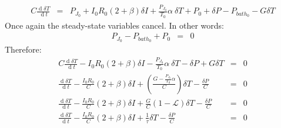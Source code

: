 \documentclass[letterpaper,10pt]{article}
\begin{document}
\begin{eqnarray}
	C \frac{\operatorname{d} \delta T}{\operatorname{d}t} &=& P_{J_0} + I_0 R_0 (2 + \beta) \delta I + \frac{P_{J_0}}{T_0}\alpha \: \delta T + P_0 + \delta P - P_{bath_0} - G\delta T 
\end{eqnarray}
Once again the steady-state variables cancel. In other words:
\begin{eqnarray}
	P_{J_0} - P_{bath_0} + P_0 &=& 0
\end{eqnarray}
Therefore:
\begin{eqnarray}
	C \frac{\operatorname{d} \delta T}{\operatorname{d}t} - I_0 R_0 (2 + \beta) \delta I - \frac{P_{J_0}}{T_0}\alpha \: \delta T - \delta P + G\delta T &=& 0 \\
	\frac{\operatorname{d} \delta T}{\operatorname{d}t} - \frac{I_0 R_0}{C} (2 + \beta) \delta I + \left(\frac{G - \frac{P_{J_0}}{T_0}\alpha}{C}\right) \delta T - \frac{\delta P}{C}  &=& 0 \\
	\frac{\operatorname{d} \delta T}{\operatorname{d}t} - \frac{I_0 R_0}{C} (2 + \beta) \delta I + \frac{G}{C}(1 - \mathcal{L}) \delta T - \frac{\delta P}{C}  &=& 0 \label{thermal-diffeq-final} \\
	\frac{\operatorname{d} \delta T}{\operatorname{d}t} - \frac{I_0 R_0}{C} (2 + \beta) \delta I + \frac{1}{\tau} \delta T - \frac{\delta P}{C}  &=& 0 \label{thermal-diffeq-final}
\end{eqnarray}
\end{document}
